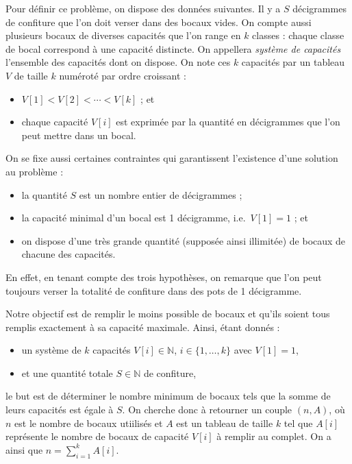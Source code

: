 \documentclass[12pt,a4paper]{article}
\begin{document}
Pour d\'efinir ce probl\`eme, on dispose des donn\'ees suivantes. Il y a $S$ d\'ecigrammes de confiture que l'on doit verser dans des bocaux vides. On compte aussi plusieurs bocaux de diverses capacit\'es que l'on range en $k$ classes : chaque classe de bocal correspond \`a une capacit\'e distincte. On appellera {\itshape syst\`eme de capacit\'es} l'ensemble des capacit\'es dont on dispose. On note ces $k$ capacit\'es par un tableau $V$ de taille $k$ num\'erot\'e par ordre croissant :
\begin{itemize}[\textbullet]
 \item $V[1] < V[2] < \cdots < V[k]$ ; et
 \item chaque capacit\'e $V[i]$ est exprim\'ee par la quantit\'e en d\'ecigrammes que l'on peut mettre dans un bocal.
\end{itemize}

\smallskip
On se fixe aussi certaines contraintes qui garantissent l'existence d'une solution au probl\`eme :
\begin{itemize}[\textbullet]
 \item la quantit\'e $S$ est un nombre entier de d\'ecigrammes ;
 \item la capacit\'e minimal d'un bocal est 1 d\'ecigramme, i.e.\ $V[1] = 1$ ; et
 \item on dispose d'une tr\`es grande quantit\'e (suppos\'ee ainsi illimit\'ee) de bocaux de chacune des capacit\'es.
\end{itemize}
En effet, en tenant compte des trois hypoth\`eses, on remarque que l'on peut toujours verser la totalit\'e de confiture dans des pots de 1 d\'ecigramme.

\bigskip
Notre objectif est de remplir le moins possible de bocaux et qu'ils soient tous remplis exactement \`a sa capacit\'e maximale. Ainsi, \'etant donn\'es :
\begin{itemize}
 \item un syst\`eme de $k$ capacit\'es $V[i] \in \mathbb{N}$, $i \in \{1,\dotsc,k\}$ avec $V[1]=1$,
 \item et une quantit\'e totale $S \in \mathbb{N}$ de confiture,
\end{itemize}
le but est de d\'eterminer le nombre minimum de bocaux tels que la somme de leurs capacit\'es est \'egale \`a $S$. On cherche donc \`a retourner un couple $(n,A)$, o\`u $n$ est le nombre de bocaux utiilis\'es et $A$ est un tableau de taille $k$ tel que $A[i]$ repr\'esente le nombre de bocaux de capacit\'e $V[i]$ \`a remplir au complet. On a ainsi que $n = \sum_{i=1}^{k} A[i]$.
\end{document}
